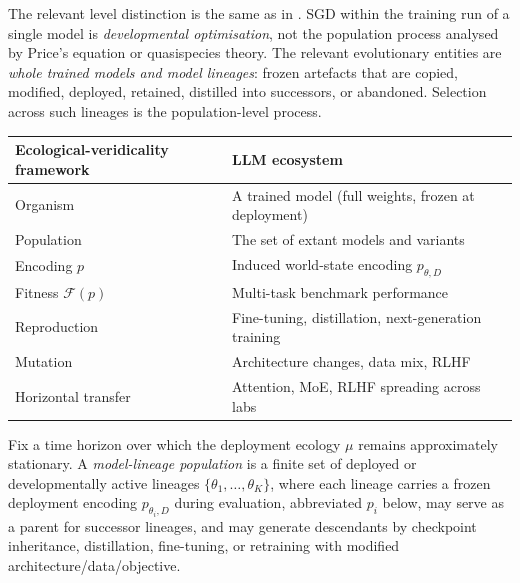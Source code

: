 \documentclass[twoside,11pt]{article}
\begin{document}
The relevant level distinction is the same as in \citet{dallariva_2026}. SGD within the training run of a single model is \emph{developmental optimisation}, not the population process analysed by Price's equation or quasispecies theory. The relevant evolutionary entities are \emph{whole trained models and model lineages}: frozen artefacts that are copied, modified, deployed, retained, distilled into successors, or abandoned. Selection across such lineages is the population-level process.

\begin{table}[ht]
\centering
\begin{tabular}{@{}ll@{}}
\toprule
Ecological-veridicality framework & LLM ecosystem \\
\midrule
Organism & A trained model (full weights, frozen at deployment) \\
Population & The set of extant models and variants \\
Encoding $p$ & Induced world-state encoding $p_{\theta,D}$ \\
Fitness $\mathcal{F}(p)$ & Multi-task benchmark performance \\
Reproduction & Fine-tuning, distillation, next-generation training \\
Mutation & Architecture changes, data mix, RLHF \\
Horizontal transfer & Attention, MoE, RLHF spreading across labs \\
\bottomrule
\end{tabular}
\end{table}

\begin{definition}
Fix a time horizon over which the deployment ecology $\mu$ remains approximately stationary. A \emph{model-lineage population} is a finite set of deployed or developmentally active lineages $\{\theta_1,\ldots,\theta_K\}$, where each lineage carries a frozen deployment encoding $p_{\theta_i,D}$ during evaluation, abbreviated $p_i$ below, may serve as a parent for successor lineages, and may generate descendants by checkpoint inheritance, distillation, fine-tuning, or retraining with modified architecture/data/objective.
\end{definition}
\end{document}
